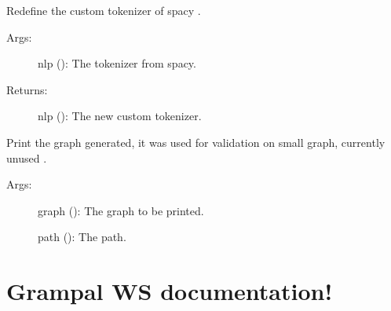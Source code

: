 \documentclass[letterpaper,10pt,english]{sphinxmanual}
\begin{document}
\begin{fulllineitems}
\label{\detokenize{keywords:keywords.custom_tokenizer}}
Redefine the custom tokenizer of spacy .
\begin{description}
\item[{Args:}] \leavevmode
nlp (): The tokenizer from spacy.

\item[{Returns:}] \leavevmode
nlp (): The new custom tokenizer.

\end{description}

\end{fulllineitems}


\begin{fulllineitems}
\label{\detokenize{keywords:keywords.print_graph}}
Print the graph generated, it was used for validation on small graph, currently unused .
\begin{description}
\item[{Args:}] \leavevmode
graph (): The graph to be printed.

path (): The path.

\end{description}

\end{fulllineitems}



\chapter{Grampal WS documentation!}
\label{\detokenize{ws:module-ws}}\label{\detokenize{ws:grampal-ws-documentation}}\label{\detokenize{ws::doc}}\label{\detokenize{ws:module-ws}}
\end{document}
